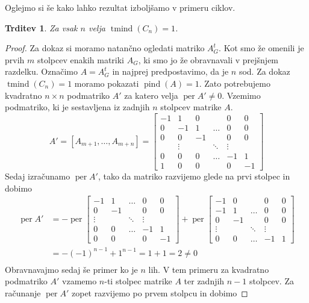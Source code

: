 \documentclass[12pt,a4paper,twoside]{article}
\theoremstyle{definition} %
\theoremstyle{plain} %
\newtheorem{trditev}[definicija]{Trditev}
\numberwithin{equation}{section}  %
\DeclareMathOperator{\per}{per}
\DeclareMathOperator{\tmind}{tmind}
\DeclareMathOperator{\pind}{pind}
\begin{document}
Oglejmo si še kako lahko rezultat izboljšamo v primeru ciklov.
\begin{trditev}
Za vsak $n$ velja $\tmind(C_n) = 1$.
\end{trditev}

\begin{proof}
Za dokaz si moramo natančno ogledati matriko $A_G^t$. Kot smo že omenili je prvih $m$ stolpcev enakih matriki $A_G$, ki smo jo že obravnavali v prejšnjem razdelku. Označimo $A =  A_G^t$ in najprej predpostavimo, da je $n$ sod. Za dokaz $\tmind(C_n) = 1$ moramo pokazati $\pind(A) = 1$. Zato potrebujemo kvadratno $n \times n$ podmatriko $A'$ za katero velja $\per A' \neq 0$. Vzemimo podmatriko, ki je sestavljena iz zadnjih $n$ stolpcev matrike $A$.
$$ 
A' =[A_{m+1}, \ldots, A_{m+n}] = 
\left[
\begin{matrix} -1 & 1 & 0 &  & 0 & 0 \\ 0 & -1 & 1 & \ldots & 0 & 0 \\
0 & 0 & -1 &  & 0 & 0 \\ 
 & \vdots &  & \ddots & \vdots &  \\ 
0 & 0 & 0 & \ldots & -1 & 1 \\
 1 & 0 & 0 &  & 0 & -1 
\end{matrix} \right]
$$
Sedaj izračunamo $\per A'$, tako da matriko razvijemo glede na prvi stolpec in dobimo
\begin{equation*}
\begin{split}
 \per A' &=-\per \left[ 
\begin{matrix} 
 -1 & 1 & \ldots & 0 & 0 \\ 
 0 & -1 &  & 0 & 0 \\ 
 \vdots &  & \ddots & \vdots &  \\ 
 0 & 0 & \ldots & -1 & 1 \\
 0 & 0 &  & 0 & -1 
\end{matrix} \right]
+\per\left[
\begin{matrix} 
- 1 & 0 &  & 0 & 0 \\
 -1 & 1 & \ldots & 0 & 0 \\  0 & -1 &  & 0 & 0 \\ 
  \vdots &  & \ddots & \vdots &  \\ 
 0 & 0 & \ldots & -1 & 1 
\end{matrix} \right] \\
&=-(-1)^{n-1} + 1^{n-1} =  1 + 1 = 2 \neq 0\\
\end{split}
\end{equation*}
Obravnavajmo sedaj še primer ko je $n$ lih. V tem primeru za kvadratno podmatriko $A'$ vzamemo $n$-ti stolpec matrike $A$ ter zadnjih $n-1$ stolpcev. Za računanje $\per A'$ zopet razvijemo po prvem stolpcu in dobimo

\end{proof}
\end{document}

